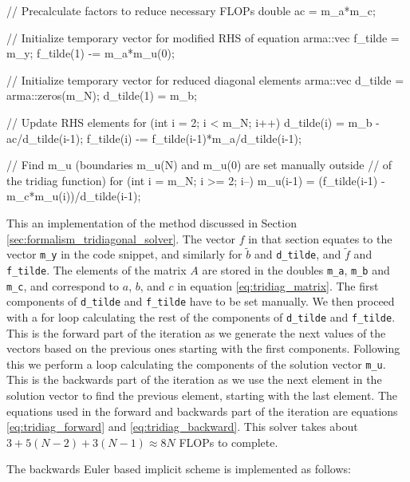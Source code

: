 \documentclass[reprint,english,notitlepage]{revtex4-1}  %
\begin{document}
\begin{cpp}
// Precalculate factors to reduce necessary FLOPs
double ac = m_a*m_c;

// Initialize temporary vector for modified RHS of equation
arma::vec f_tilde = m_y;
f_tilde(1) -= m_a*m_u(0);

// Initialize temporary vector for reduced diagonal elements
arma::vec d_tilde = arma::zeros(m_N);
d_tilde(1) = m_b;

// Update RHS elements
for (int i = 2; i < m_N; i++){
  d_tilde(i) = m_b - ac/d_tilde(i-1);
  f_tilde(i) -= f_tilde(i-1)*m_a/d_tilde(i-1);
}

// Find m_u (boundaries m_u(N) and m_u(0) are set manually outside
// of the tridiag function)
for (int i = m_N; i >= 2; i--){
  m_u(i-1) = (f_tilde(i-1) - m_c*m_u(i))/d_tilde(i-1);
}
\end{cpp} 

This an implementation of the method discussed in Section \ref{sec:formalism_tridiagonal_solver}. The vector $f$ in that section equates to the vector \verb+m_y+ in the code snippet, and similarly for $\tilde{b}$ and \verb+d_tilde+, and $\tilde{f}$ and \verb+f_tilde+. The elements of the matrix $A$ are stored in the doubles \verb+m_a+, \verb+m_b+ and \verb+m_c+, and correspond to $a$, $b$, and $c$ in equation \eqref{eq:tridiag_matrix}. The first components of \verb+d_tilde+ and \verb+f_tilde+ have to be set manually. We then proceed with a for loop calculating the rest of the components of \verb+d_tilde+ and \verb+f_tilde+. This is the forward part of the iteration as we generate the next values of the vectors based on the previous ones starting with the first components. Following this we perform a loop calculating the components of the solution vector \verb+m_u+. This is the backwards part of the iteration as we use the next element in the solution vector to find the previous element, starting with the last element. The equations used in the forward and backwards part of the iteration are equations \eqref{eq:tridiag_forward} and \eqref{eq:tridiag_backward}. This solver takes about $3 + 5(N-2) + 3(N-1) \approx 8N$ FLOPs to complete. 

The backwards Euler based implicit scheme is implemented as follows:

\begin{cpp}
// Iterate over timesteps
for (int j = 1; j <= m_M; j++){
  // Use tridiagonal solver to move one step
  tridiag();

  // Set boundary conditions
  m_u(0) = m_lb;
  m_u(m_N) = m_ub;

  // Update previous solution
  m_y = m_u;
  }
}
\end{cpp}  
\end{document}
